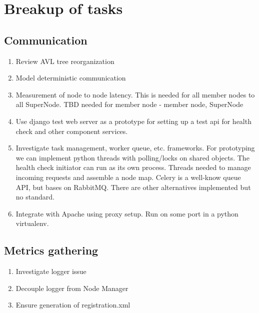 \documentclass[oneside,12pt]{memoir}
\begin{document}
\section{Breakup of tasks}

\subsection{Communication}

\begin{enumerate}
\item
Review AVL tree reorganization
\item
Model deterministic communication
\item
Measurement of node to node latency.  This is needed for all member nodes to all SuperNode.  TBD  needed for member node - member node, SuperNode 
\item
Use django test web server as a prototype for setting up a test api for health check and other component services.
\item
Investigate task management, worker queue, etc.  frameworks.  For prototyping we can implement python threads with polling/locks on shared objects.  The health check initiator can run as its own process.  Threads needed to manage incoming requests and assemble a node map.  Celery is a well-know queue API, but bases on RabbitMQ.  There are other alternatives implemented but no standard.
\item
Integrate with Apache using proxy setup.  Run on some port in a python virtualenv.


\end{enumerate}



\subsection{Metrics gathering}
\begin{enumerate}
\item Investigate logger issue
\item Decouple logger from Node Manager
\item Ensure generation of registration.xml
\end{enumerate}
\end{document}
